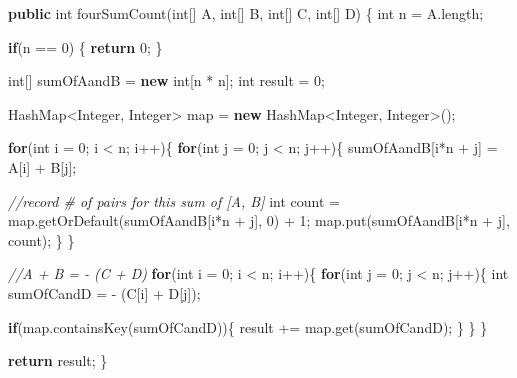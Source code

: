 \documentclass[]{book}
\newenvironment{Shaded}{\begin{snugshade}}{\end{snugshade}}
\newcommand{\BuiltInTok}[1]{#1}
\newcommand{\CommentTok}[1]{\textcolor[rgb]{0.56,0.35,0.01}{\textit{#1}}}
\newcommand{\DataTypeTok}[1]{\textcolor[rgb]{0.13,0.29,0.53}{#1}}
\newcommand{\DecValTok}[1]{\textcolor[rgb]{0.00,0.00,0.81}{#1}}
\newcommand{\FunctionTok}[1]{\textcolor[rgb]{0.00,0.00,0.00}{#1}}
\newcommand{\KeywordTok}[1]{\textcolor[rgb]{0.13,0.29,0.53}{\textbf{#1}}}
\newcommand{\NormalTok}[1]{#1}
\begin{document}
\begin{Shaded}
\begin{Highlighting}[]
\KeywordTok{public} \DataTypeTok{int} \FunctionTok{fourSumCount}\NormalTok{(}\DataTypeTok{int}\NormalTok{[] A, }\DataTypeTok{int}\NormalTok{[] B, }\DataTypeTok{int}\NormalTok{[] C, }\DataTypeTok{int}\NormalTok{[] D) \{}
    \DataTypeTok{int}\NormalTok{ n = A.}\FunctionTok{length}\NormalTok{;}

    \KeywordTok{if}\NormalTok{(n == }\DecValTok{0}\NormalTok{) \{}
        \KeywordTok{return} \DecValTok{0}\NormalTok{;}
\NormalTok{    \}}

    \DataTypeTok{int}\NormalTok{[] sumOfAandB = }\KeywordTok{new} \DataTypeTok{int}\NormalTok{[n * n];}
    \DataTypeTok{int}\NormalTok{ result = }\DecValTok{0}\NormalTok{;}

    \BuiltInTok{HashMap}\NormalTok{<}\BuiltInTok{Integer}\NormalTok{, }\BuiltInTok{Integer}\NormalTok{> map = }\KeywordTok{new} \BuiltInTok{HashMap}\NormalTok{<}\BuiltInTok{Integer}\NormalTok{, }\BuiltInTok{Integer}\NormalTok{>();}

    \KeywordTok{for}\NormalTok{(}\DataTypeTok{int}\NormalTok{ i = }\DecValTok{0}\NormalTok{; i < n; i++)\{}
        \KeywordTok{for}\NormalTok{(}\DataTypeTok{int}\NormalTok{ j = }\DecValTok{0}\NormalTok{; j < n; j++)\{}
\NormalTok{            sumOfAandB[i*n + j] = A[i] + B[j];}

            \CommentTok{//record # of pairs for this sum of [A, B]}
            \DataTypeTok{int}\NormalTok{ count = map.}\FunctionTok{getOrDefault}\NormalTok{(sumOfAandB[i*n + j], }\DecValTok{0}\NormalTok{) + }\DecValTok{1}\NormalTok{;}
\NormalTok{            map.}\FunctionTok{put}\NormalTok{(sumOfAandB[i*n + j], count);}
\NormalTok{        \}}
\NormalTok{    \}}

    \CommentTok{//A + B = - (C + D)}
    \KeywordTok{for}\NormalTok{(}\DataTypeTok{int}\NormalTok{ i = }\DecValTok{0}\NormalTok{; i < n; i++)\{}
        \KeywordTok{for}\NormalTok{(}\DataTypeTok{int}\NormalTok{ j = }\DecValTok{0}\NormalTok{; j < n; j++)\{}
            \DataTypeTok{int}\NormalTok{ sumOfCandD = - (C[i] + D[j]);}

            \KeywordTok{if}\NormalTok{(map.}\FunctionTok{containsKey}\NormalTok{(sumOfCandD))\{}
\NormalTok{                result += map.}\FunctionTok{get}\NormalTok{(sumOfCandD);}
\NormalTok{            \}}
\NormalTok{        \}}
\NormalTok{    \}}


    \KeywordTok{return}\NormalTok{ result;}
\NormalTok{\}}
\end{Highlighting}
\end{Shaded}
\end{document}
